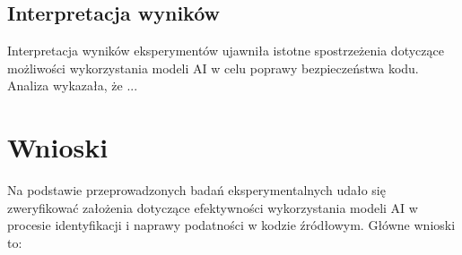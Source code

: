 \subsection{Interpretacja wyników}
\label{subsec:interpretacja_wynikow}

Interpretacja wyników eksperymentów ujawniła istotne spostrzeżenia dotyczące możliwości wykorzystania modeli AI w celu poprawy bezpieczeństwa kodu. Analiza wykazała, że ...


\section{Wnioski}
\label{sec:wnioski}

Na podstawie przeprowadzonych badań eksperymentalnych udało się zweryfikować założenia dotyczące efektywności wykorzystania modeli AI w procesie identyfikacji i naprawy podatności w kodzie źródłowym. Główne wnioski to:

